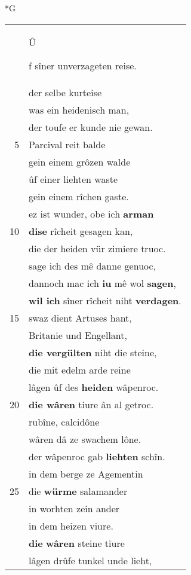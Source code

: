 \documentclass[8pt,a4paper,notitlepage]{article}
\begin{document}
\newpage
\begin{table}[ht]
\begin{minipage}[t]{0.5\linewidth}
\small
\begin{center}*G
\end{center}
\begin{tabular}{rl}
 & \begin{large}Û\end{large}f sîner unverzageten reise.\\ 
 & der selbe kurteise\\ 
 & was ein heidenisch man,\\ 
 & der toufe er kunde nie gewan.\\ 
5 & Parcival reit balde\\ 
 & gein einem grôzen walde\\ 
 & ûf einer liehten waste\\ 
 & gein einem rîchen gaste.\\ 
 & ez ist wunder, obe ich \textbf{arman}\\ 
10 & \textbf{dise} rîcheit gesagen kan,\\ 
 & die der heiden vür zimiere truoc.\\ 
 & sage ich des mê danne genuoc,\\ 
 & dannoch mac ich \textbf{iu} mê wol \textbf{sagen},\\ 
 & \textbf{wil ich} sîner rîcheit niht \textbf{verdagen}.\\ 
15 & swaz dient Artuses hant,\\ 
 & Britanie und Engellant,\\ 
 & \textbf{die vergülten} niht die steine,\\ 
 & die mit edelm arde reine\\ 
 & lâgen ûf des \textbf{heiden} wâpenroc.\\ 
20 & \textbf{die wâren} tiure ân al getroc.\\ 
 & rubîne, calcidône\\ 
 & wâren dâ ze swachem lône.\\ 
 & der wâpenroc gab \textbf{liehten} schîn.\\ 
 & in dem berge ze Agementin\\ 
25 & die \textbf{würme} salamander\\ 
 & in worhten zein ander\\ 
 & in dem heizen viure.\\ 
 & \textbf{die} \textbf{wâren} steine tiure\\ 
 & lâgen drûfe tunkel unde lieht,\\ 

\end{tabular}
\end{minipage}
\end{table}
\end{document}
